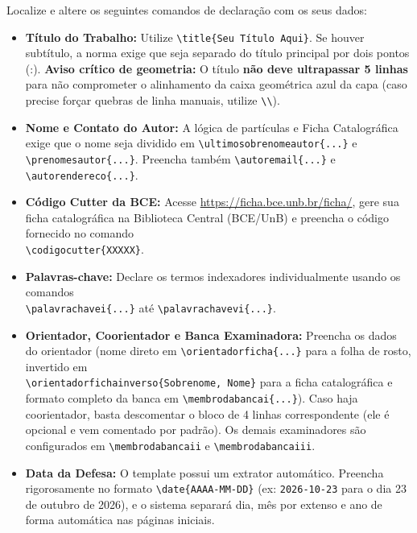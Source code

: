 \documentclass[12pt, a4paper]{article}
\begin{document}
Localize e altere os seguintes comandos de declaração com os seus dados:

\begin{itemize}
    \item \textbf{Título do Trabalho:} Utilize \texttt{\textbackslash title\{Seu Título Aqui\}}. Se houver subtítulo, a norma exige que seja separado do título principal por dois pontos (:). \textbf{Aviso crítico de geometria:} O título \textbf{não deve ultrapassar 5 linhas} para não comprometer o alinhamento da caixa geométrica azul da capa (caso precise forçar quebras de linha manuais, utilize \texttt{\textbackslash\textbackslash}).
    \item \textbf{Nome e Contato do Autor:} A lógica de partículas e Ficha Catalográfica exige que o nome seja dividido em \texttt{\textbackslash ultimosobrenomeautor\{...\}} e \texttt{\textbackslash prenomesautor\{...\}}. Preencha também \texttt{\textbackslash autoremail\{...\}} e \texttt{\textbackslash autorendereco\{...\}}.
    \item \textbf{Código Cutter da BCE:} Acesse \url{https://ficha.bce.unb.br/ficha/}, gere sua ficha catalográfica na Biblioteca Central (BCE/UnB) e preencha o código fornecido no comando \\ \texttt{\textbackslash codigocutter\{XXXXX\}}.
    \item \textbf{Palavras-chave:} Declare os termos indexadores individualmente usando os comandos \\ \texttt{\textbackslash palavrachavei\{...\}} até \texttt{\textbackslash palavrachavevi\{...\}}.
    \item \textbf{Orientador, Coorientador e Banca Examinadora:} Preencha os dados do orientador (nome direto em \texttt{\textbackslash orientadorficha\{...\}} para a folha de rosto, invertido em \\ \texttt{\textbackslash orientadorfichainverso\{Sobrenome, Nome\}} para a ficha catalográfica e formato completo da banca em \texttt{\textbackslash membrodabancai\{...\}}). Caso haja coorientador, basta descomentar o bloco de 4 linhas correspondente (ele é opcional e vem comentado por padrão). Os demais examinadores são configurados em \texttt{\textbackslash membrodabancaii} e \texttt{\textbackslash membrodabancaiii}.
    \item \textbf{Data da Defesa:} O template possui um extrator automático. Preencha rigorosamente no formato \texttt{\textbackslash date\{AAAA-MM-DD\}} (ex: \texttt{2026-10-23} para o dia 23 de outubro de 2026), e o sistema separará dia, mês por extenso e ano de forma automática nas páginas iniciais.

\end{itemize}
\end{document}
